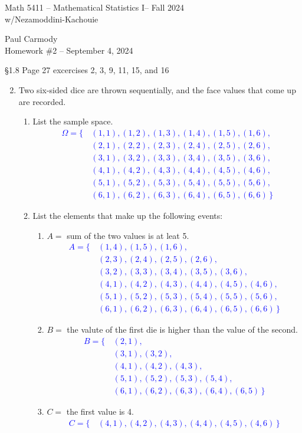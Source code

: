 \documentclass[10pt,a4paper]{report}
\newcommand{\CLASSNAME}{Math 5411 -- Mathematical Statistics I}
\newcommand{\PROFESSOR}{Nezamoddini-Kachouie}
\newcommand{\STUDENTNAME}{Paul Carmody}
\newcommand{\ASSIGNMENT}{Homework \#2 }
\newcommand{\DUEDATE}{September 4, 2024}
\newcommand{\SEMESTER}{Fall 2024}
\newcommand{\BLUE}[1]{\textcolor{blue}{#1}}
\begin{document}
\begin{center}
	\Large{\CLASSNAME -- \SEMESTER} \\
	\large{w/\PROFESSOR}
\end{center}
\begin{center}
	\STUDENTNAME \\
	\ASSIGNMENT -- \DUEDATE\\
\end{center}

\S 1.8 Page 27 excercises 2, 3, 9, 11, 15, and 16 

\begin{enumerate}
	\setcounter{enumi}{1}
	\item Two six-sided dice are thrown sequentially, and the face values that come up are recorded.
	
	\begin{enumerate}[label=\alph*.]
	\item List the sample space.
	\BLUE{ 
	\begin{align*}
		\Omega = \{\, &(1,1),(1,2),(1,3),(1,4),(1,5),(1,6), \\
			&(2,1),(2,2),(2,3),(2,4),(2,5),(2,6), \\
			&(3,1),(3,2),(3,3),(3,4),(3,5),(3,6), \\
			&(4,1),(4,2),(4,3),(4,4),(4,5),(4,6), \\
			&(5,1),(5,2),(5,3),(5,4),(5,5),(5,6), \\
			&(6,1),(6,2),(6,3),(6,4),(6,5),(6,6)\,
		\}
	\end{align*} }
	\item List the elements that make up the following events:
	\begin{enumerate}
	\item $A =$ sum of the two values is at leat 5.
\BLUE{
	\begin{align*}
		A = \{\, &(1,4),(1,5),(1,6), \\
			&(2,3),(2,4),(2,5),(2,6), \\
			&(3,2),(3,3),(3,4),(3,5),(3,6), \\
			&(4,1),(4,2),(4,3),(4,4),(4,5),(4,6), \\
			&(5,1),(5,2),(5,3),(5,4),(5,5),(5,6), \\
			&(6,1),(6,2),(6,3),(6,4),(6,5),(6,6)\,
		\}
	\end{align*} }
	\item $B =$ the valute of the first die is higher than the value of the second.
\BLUE{ \begin{align*}
	B = \{\,&(2,1),\\
			&(3,1),(3,2),\\
			&(4,1),(4,2),(4,3), \\
			&(5,1),(5,2),(5,3),(5,4),\\
			&(6,1),(6,2),(6,3),(6,4),(6,5)\,
		\}
\end{align*}
}
	\item $C =$ the first value is 4.
\BLUE{
\begin{align*}
		C = \{\, &(4,1),(4,2),(4,3),(4,4),(4,5),(4,6)\,  	\}
	\end{align*} }
	

\end{enumerate}
\end{enumerate}
\end{enumerate}
\end{document}
